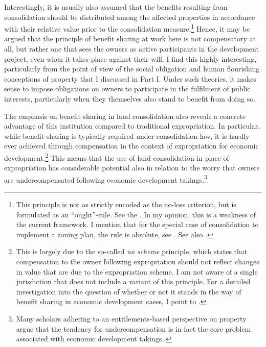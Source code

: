 Interestingly, it is usually also assumed that the benefits resulting from consolidation should be distributed among the affected properties in accordance with their relative value prior to the consolidation measure.\footnote{This principle is not as strictly encoded as the no-loss criterion, but is formulated as an ``ought''-rule. See the \cite[31|41]{lca79}. In my opinion, this is a weakness of the current framework. I mention that for the special case of consolidation to implement a zoning plan, the rule is absolute, see \cite[3 b)]{lca79}. See also \cite{hauge15}.} Hence, it may be argued that the principle of benefit sharing at work here is not compensatory at all, but rather one that sees the owners as active participants in the development project, even when it takes place against their will. I find this highly interesting, particularly from the point of view of the social obligation and human flourishing conceptions of property that I discussed in Part I. Under such theories, it makes sense to impose obligations on owners to participate in the fulfilment of public interests, particularly when they themselves also stand to benefit from doing so.

The emphasis on benefit sharing in land consolidation also reveals a concrete advantage of this institution compared to traditional expropriation. In particular, while benefit sharing is typically required under consolidation law, it is hardly ever achieved through compensation in the context of expropriation for economic development.\footnote{This is largely due to the so-called {\it no scheme} principle, which states that compensation to the owner following expropriation should not reflect changes in value that are due to the expropriation scheme. I am not aware of a single jurisdiction that does not include a variant of this principle. For a detailed investigation into the question of whether or not it stands in the way of benefit sharing in economic development cases, I point to \cite{dyrkolbotn15}.} This means that the use of land consolidation in place of expropriation has considerable potential also in relation to the worry that owners are undercompensated following economic development takings.\footnote{Many scholars adhering to an entitlements-based perspective on property argue that the tendency for undercompensation is in fact the core problem associated with economic development takings.\cite{fennel04,lehavi07,bell07}.}

